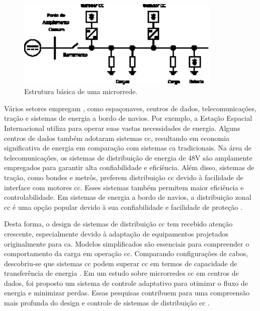 \begin{figure}[H]
  \centering
  \includegraphics[width=0.87\textwidth]{figuras/microgrid.eps}
  \caption{Estrutura básica de uma microrrede.}
  \label{fig:microgrid}
\end{figure}

Vários setores empregam , como espaçonaves, centros de dados, telecomunicações, tração e sistemas de energia a bordo de navios. Por exemplo, a Estação Espacial Internacional utiliza  para operar suas vastas necessidades de energia. Alguns centros de dados também adotaram sistemas \acrshort{cc}, resultando em economia significativa de energia em comparação com sistemas \acrshort{ca} tradicionais. Na área de telecomunicações, os sistemas de distribuição de energia de 48V são amplamente empregados para garantir alta confiabilidade e eficiência. Além disso, sistemas de tração, como bondes e metrôs, preferem distribuição \acrshort{cc} devido à facilidade de interface com motores \acrshort{cc}. Esses sistemas também permitem maior eficiência e controlabilidade. Em sistemas de energia a bordo de navios, a distribuição zonal \acrshort{cc} é uma opção popular devido à sua confiabilidade e facilidade de proteção \citep{Elsayed2015}.

Desta forma, o design de sistemas de distribuição \acrshort{cc} tem recebido atenção crescente, especialmente devido à adaptação de equipamentos projetados originalmente para \acrshort{ca}. Modelos simplificados são essenciais para compreender o comportamento da carga em operação \acrshort{cc}. Comparando configurações de cabos, descobriu-se que sistemas \acrshort{cc} podem superar \acrshort{cc} em termos de capacidade de transferência de energia \citep{Salomonsson2007}. Em um estudo sobre microrredes \acrshort{cc} em centros de dados, foi proposto um sistema de controle adaptativo para otimizar o fluxo de energia e minimizar perdas. Essas pesquisas contribuem para uma compreensão mais profunda do design e controle de sistemas de distribuição \acrshort{cc} \citep{Salomonsson2008}.

